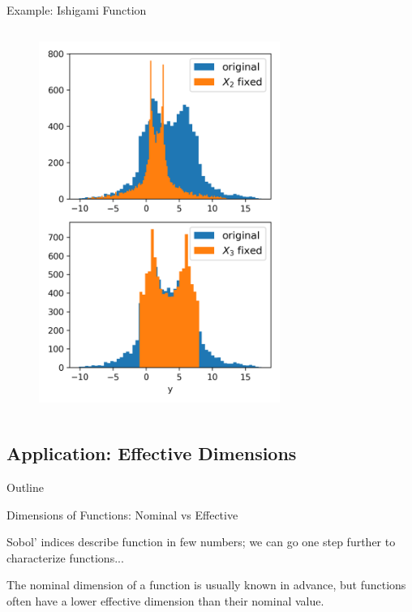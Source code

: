 \documentclass[english,aspectratio=169]{beamer}
\renewcommand{\emph}[1]{\textcolor[HTML]{006d2c}{\fontseries{sb}\selectfont #1}}
\begin{document}
\begin{frame}[fragile]{Example: Ishigami Function}
\begin{columns}[T,onlytextwidth]
  \begin{column}{0.4\textwidth}
    \begin{figure}
      \centering
      \includegraphics[width=0.7\textwidth]{./figures/ishigami.png}
    \end{figure}
  \end{column}
  
  \end{columns}
  
\end{frame}

\subsection{Application: Effective Dimensions}

\begin{frame}{Outline}
  \tableofcontents[currentsubsection]
\end{frame}

\begin{frame}[fragile]{Dimensions of Functions: Nominal vs Effective}
\small

Sobol' indices describe function in few numbers;
we can go one step further to characterize functions...

\vspace{1.0em}

The \emph{nominal dimension} of a function is usually known
in advance, but functions often have a lower \emph{effective dimension} 
than their nominal value.

\end{frame}
\end{document}
